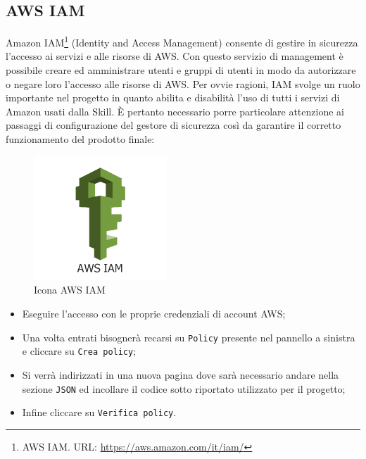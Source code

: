 \subsection{AWS IAM}
\label{aws-iam}
Amazon IAM\footnote{AWS IAM. URL: \href{https://aws.amazon.com/it/iam/}{https://aws.amazon.com/it/iam/}} (Identity and Access Management) consente di gestire in sicurezza l'accesso ai servizi e alle risorse di AWS. Con questo servizio di management è possibile creare ed amministrare utenti e gruppi di utenti in modo da autorizzare o negare loro l'accesso alle risorse di AWS. Per ovvie ragioni, IAM svolge un ruolo importante nel progetto in quanto abilita e disabilità l'uso di tutti i servizi di Amazon usati dalla Skill. È pertanto necessario porre particolare attenzione ai passaggi di configurazione del gestore di sicurezza così da garantire il corretto funzionamento del prodotto finale:
\begin{minipage}{0.4\textwidth}
	\begin{figure}[H]
		\includegraphics[width=5cm]{immagini/amazon-iam.png}
		\caption{\label{fig:icona_aws_iam}Icona AWS IAM}
	\end{figure}
\end{minipage}
\begin{minipage}{0.6\textwidth}
	\begin{itemize}
		\item Eseguire l'accesso con le proprie credenziali di account AWS;
    	\item Una volta entrati bisognerà recarsi su \texttt{Policy} presente nel pannello a sinistra e cliccare su \texttt{Crea policy};
    	\item Si verrà indirizzati in una nuova pagina dove sarà necessario andare nella sezione \texttt{JSON} ed incollare il codice sotto riportato utilizzato per il progetto;
    	\item Infine cliccare su \texttt{Verifica policy}.
	\end{itemize}
\end{minipage}

